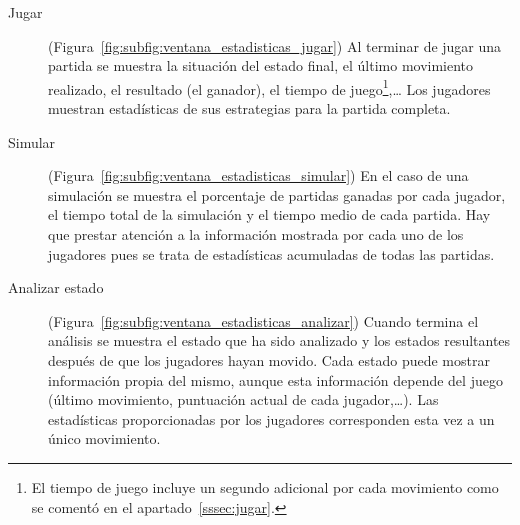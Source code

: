\begin{description}
	\item[Jugar] (Figura~\ref{fig:subfig:ventana_estadisticas_jugar}) Al terminar de jugar una partida se muestra la situación del estado final, el último movimiento realizado, el resultado (el ganador), el tiempo de juego\footnote{El tiempo de juego incluye un segundo adicional por cada movimiento como se comentó en el apartado~\ref{sssec:jugar}.},\ldots
Los jugadores muestran estadísticas de sus estrategias para la partida completa.

	\item[Simular] (Figura~\ref{fig:subfig:ventana_estadisticas_simular}) En el caso de una simulación se muestra el porcentaje de partidas ganadas por cada jugador, el tiempo total de la simulación y el tiempo medio de cada partida.
Hay que prestar atención a la información mostrada por cada uno de los jugadores pues se trata de estadísticas acumuladas de todas las partidas.

	\item[Analizar estado] (Figura~\ref{fig:subfig:ventana_estadisticas_analizar}) Cuando termina el análisis se muestra el estado que ha sido analizado y los estados resultantes después de que los jugadores hayan movido.
	Cada estado puede mostrar información propia del mismo, aunque esta información depende del juego (último movimiento, puntuación actual de cada jugador,\ldots).
	Las estadísticas proporcionadas por los jugadores corresponden esta vez a un único movimiento.
	
\end{description}

